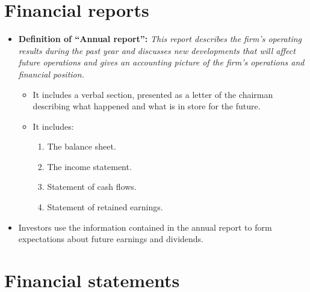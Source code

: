 \documentclass{article}
\renewcommand{\termdefinition}[2]{
    \textbf{Definition of ``#1'':} \emph{#2}
}
\begin{document}
\section{Financial reports}
\begin{itemize}
    \item \termdefinition{Annual report}{ This report describes the firm's operating results during the past year and discusses new developments that will affect future operations and gives an accounting picture of the firm's operations and financial position.} 
        \begin{itemize}
            \item It includes a verbal section, presented as a letter of the chairman describing what happened and what is in store for the future. 
            \item It includes:  
                \begin{enumerate}
                    \item The balance sheet. 
                    \item The income statement. 
                    \item Statement of cash flows. 
                    \item Statement of retained earnings. 
                \end{enumerate}
        \end{itemize}
    
    \item Investors use the information contained in the annual report to form expectations about future earnings and dividends.
\end{itemize}


\section{Financial statements}
\end{document}
